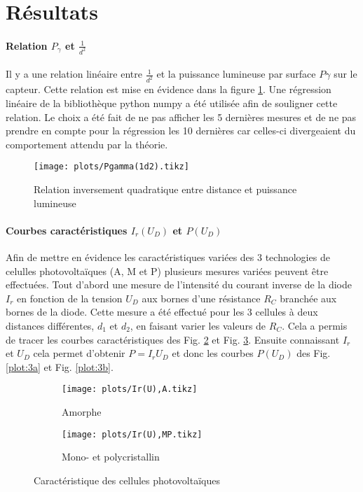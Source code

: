 \section{Résultats}

\paragraph*{Relation \(P_\gamma\) et \(\frac{1}{d^2}\)}
Il y a une relation linéaire entre \(\frac{1}{d^2}\) et la puissance lumineuse par surface \(P\gamma\) sur le capteur. Cette relation est mise en évidence dans la figure \ref{plot:1}. Une régression linéaire de la bibliothèque python numpy a été utilisée afin de souligner cette relation.
Le choix a été fait de ne pas afficher les 5 dernières mesures et de ne pas prendre en compte pour la régression les 10 dernières car celles-ci divergeaient du comportement attendu par la théorie.


\begin{figure}[h]
    \centering
    \texttt{[image: plots/Pgamma(1d2).tikz]}
    \caption{Relation inversement quadratique entre distance et puissance lumineuse}
    \label{plot:1}
\end{figure}

\paragraph*{Courbes caractéristiques \(I_r(U_D)\) et \(P(U_D)\)}
Afin de mettre en évidence les caractéristiques variées des 3 technologies de celulles photovoltaïques (A, M et P) plusieurs mesures variées peuvent être effectuées.
Tout d'abord une mesure de l'intensité du courant inverse de la diode \(I_r\) en fonction de la tension \(U_D\) aux bornes d'une résistance \(R_C\) branchée aux bornes de la diode.
Cette mesure a été effectué pour les 3 cellules à deux distances différentes, \(d_1\) et \(d_2\), en faisant varier les valeurs de \(R_C\). Cela a permis de tracer les courbes caractéristiques des Fig. \ref{plot:2a} et Fig. \ref{plot:2b}.
Ensuite connaissant \(I_r\) et \(U_D\) cela permet d'obtenir \(P = I_r U_D\) et donc les courbes \(P(U_D)\) des Fig. \ref{plot:3a} et Fig. \ref{plot:3b}.

\begin{figure}
    \centering
    \begin{subfigure}[c]{0.4\linewidth}
        \centering
        \texttt{[image: plots/Ir(U),A.tikz]}
        \caption{Amorphe}
        \label{plot:2a}
    \end{subfigure}
    \begin{subfigure}[c]{0.4\linewidth}
        \centering
        \texttt{[image: plots/Ir(U),MP.tikz]}
        \caption{Mono- et polycristallin}
        \label{plot:2b}
    \end{subfigure}
    \caption{Caractéristique des cellules photovoltaïques}
    \label{plot:2}
\end{figure}

